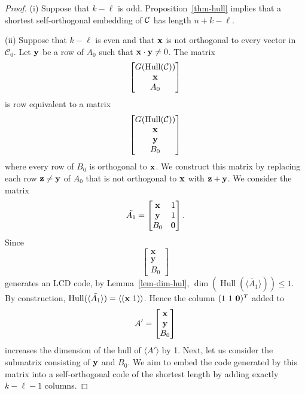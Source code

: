 \documentclass{article}
\theoremstyle{definition}
\theoremstyle{remark}
\newcommand{\C}{\mbox{$\cal C$}}
\newcommand{\Hull}{\operatorname{Hull}}
\begin{document}
\begin{proof}
(i) Suppose that $k - \ell$ is odd.  Proposition~\ref{thm-hull} implies that a shortest self-orthogonal embedding of $\C$ has length $n+k-\ell$.

(ii) Suppose that $k - \ell$ is even and that ${\bf{x}}$ is not orthogonal to every vector in $\mathcal C_0$. Let ${\bf y}$ be a row of $A_0$ such that ${\bf x} \cdot {\bf y} \neq 0$.  The matrix
\[
\begin{bmatrix}
G(\operatorname{Hull}(\mathcal{C})) \\
{\bf{x}} \\
A_0   \\
\end{bmatrix}
\]
is row equivalent to a matrix
\[
\begin{bmatrix}
G(\operatorname{Hull}(\mathcal{C})) \\
{\bf{x}} \\
{\bf{y}}\\
B_0
\end{bmatrix}
\]
where every row of $B_0$ is orthogonal to ${\bf x}$.  We construct this matrix by replacing each row ${\bf z} \neq {\bf y}$ of $A_0$ that is not orthogonal to ${\bf x}$ with ${\bf z} + {\bf y}$.  We consider the matrix
\[
\tilde{A_1} = \begin{bmatrix}
{\bf{x}} & 1 \\
{\bf{y}} & 1 \\
B_0   & {\bf{0}}\\
\end{bmatrix}.
\]
Since
\[
\begin{bmatrix}
    \mathbf{x}\\\mathbf{y}\\B_0
\end{bmatrix}
\]
generates an LCD code, by Lemma~\ref{lem-dim-hul}, $\dim(\operatorname{Hull}(\langle\tilde{A_1}\rangle))\le 1$. By construction, $\Hull(\langle\tilde{A_1}\rangle) = \langle ( {\bf{x}}~ 1) \rangle$. Hence the column $(1 ~1~ {\bf{0}})^T$ added to
\[
A' = \begin{bmatrix}
{\bf{x}} \\
{\bf{y}} \\
B_0    \\
\end{bmatrix}
\]
increases the dimension of the hull of $\langle A'\rangle$ by 1. Next, let us consider the submatrix consisting of ${\bf{y}}$ and $B_0$. We aim to embed the code generated by this matrix into a self-orthogonal code of the shortest length by adding exactly $k - \ell -1$ columns.


\end{proof}
\end{document}
